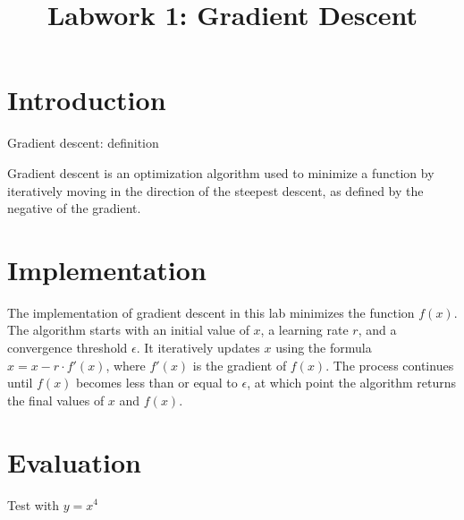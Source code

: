 \documentclass{article}
\title{Labwork 1: Gradient Descent}
\begin{document}
\maketitle

\setlength\parindent{0pt}

\section{Introduction}

Gradient descent: definition

Gradient descent is an optimization algorithm used to minimize a function by iteratively moving in the direction of the steepest descent, as defined by the negative of the gradient.

\section{Implementation}

The implementation of gradient descent in this lab minimizes the function $f(x)$. 
The algorithm starts with an initial value of $x$, a learning rate $r$, and a convergence threshold $\epsilon$. 
It iteratively updates $x$ using the formula $x = x - r \cdot f'(x)$, where $f'(x)$ is the gradient of $f(x)$. 
The process continues until $f(x)$ becomes less than or equal to $\epsilon$, at which point the algorithm returns the final values of $x$ and $f(x)$.

\section{Evaluation}

Test with $y = x^4$
\end{document}
